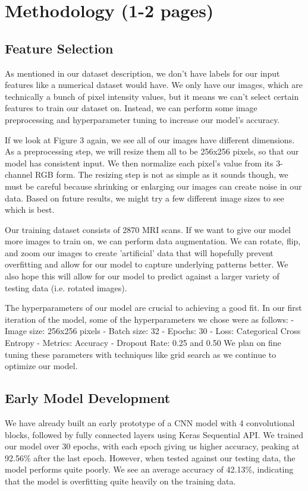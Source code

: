 \documentclass[conference]{IEEEtran}
\begin{document}
\section{Methodology (1-2 pages)}

\subsection{Feature Selection}
As mentioned in our dataset description, we don't have labels for our input features like a numerical dataset would have. We only have our images, which are technically a bunch of pixel intensity values, but it means we can't select certain features to train our dataset on. Instead, we can perform some image preprocessing and hyperparameter tuning to increase our model's accuracy.

If we look at Figure 3 again, we see all of our images have different dimensions.  As a preprocessing step, we will resize them all to be 256x256 pixels, so that our model has consistent input. We then normalize each pixel's value from its 3-channel RGB form. The resizing step is not as simple as it sounds though, we must be careful because shrinking or enlarging our images can create noise in our data. Based on future results, we might try a few different image sizes to see which is best. 

Our training dataset consists of 2870 MRI scans. If we want to give our model more images to train on, we can perform data augmentation. We can rotate, flip, and zoom our images to create 'artificial' data that will hopefully prevent overfitting and allow for our model to capture underlying patterns better. We also hope this will allow for our model to predict against a larger variety of testing data (i.e. rotated images). 

The hyperparameters of our model are crucial to achieving a good fit. In our first iteration of the model, some of the hyperparameters we chose were as follows:
- Image size: 256x256 pixels		- Batch size: 32		- Epochs: 30	
- Loss:  Categorical Cross Entropy 	- Metrics: Accuracy		- Dropout Rate: 0.25 and 0.50
We plan on fine tuning these parameters with techniques like grid search as we continue to optimize our model. 

\subsection{Early Model Development}

We have already built an early prototype of a CNN model with 4 convolutional blocks, followed by fully connected layers using Keras Sequential API. We trained our model over 30 epochs, with each epoch giving us higher accuracy, peaking at 92.56\% after the last epoch. However, when tested against our testing data, the model performs quite poorly. We see an average accuracy of 42.13\%, indicating that the model is overfitting quite heavily on the training data.
\end{document}
